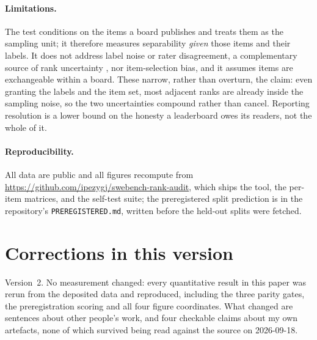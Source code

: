 \documentclass[11pt]{article}
\begin{document}
\paragraph{Limitations.} The test conditions on the items a board publishes and treats them as the
sampling unit; it therefore measures separability \emph{given} those items and their labels. It does
not address label noise or rater disagreement, a complementary source of rank uncertainty
\citep{aroyo2015}, nor item-selection bias, and it assumes items are exchangeable within a board.
These narrow, rather than overturn, the claim: even granting the labels and the item set, most
adjacent ranks are already inside the sampling noise, so the two uncertainties compound rather than
cancel. Reporting resolution is a lower bound on the honesty a leaderboard owes its readers, not the
whole of it.

\paragraph{Reproducibility.} All data are public and all figures recompute from
\url{https://github.com/ipezygj/swebench-rank-audit},
which ships the tool, the per-item matrices, and the self-test suite; the preregistered split
prediction is in the repository's \texttt{PREREGISTERED.md}, written before the held-out splits were
fetched.


\section*{Corrections in this version}
Version~2. No measurement changed: every quantitative result in this paper was rerun
from the deposited data and reproduced, including the three parity gates, the
preregistration scoring and all four figure coordinates. What changed are sentences
about other people's work, and four checkable claims about my own artefacts, none of
which survived being read against the source on 2026-09-18.
\end{document}
